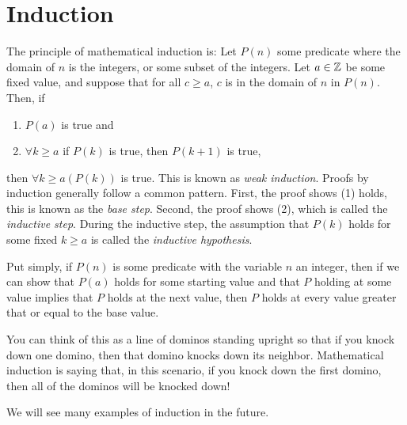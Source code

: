 \guard
\section{Induction}
\label{sec:induction}



The principle of mathematical induction is:
Let $P(n)$ some predicate where the domain of $n$ is the integers, or some subset of the integers.
Let $a\in\mathbb{Z}$ be some fixed value, and suppose that for all $c\geq a$, $c$ is in the domain of $n$ in $P(n)$.
Then, if
\begin{enumerate}
  \item $P(a)$ is true and
  \item $\forall k\geq a$ if $P(k)$ is true, then $P(k+1)$ is true,
\end{enumerate}
then $\forall k\geq a(P(k))$ is true.
This is known as \emph{weak induction}.
Proofs by induction generally follow a common pattern.
First, the proof shows (1) holds, this is known as the \emph{base step}.
Second, the proof shows (2), which is called the \emph{inductive step}.
During the inductive step, the assumption that $P(k)$ holds for some fixed $k\geq a$ is called the \emph{inductive hypothesis}.

Put simply, if $P(n)$ is some predicate with the variable $n$ an integer, then if we can show that $P(a)$ holds for some starting value and that $P$ holding at some value implies that $P$ holds at the next value, then $P$ holds at every value greater that or equal to the base value.

You can think of this as a line of dominos standing upright so that if you knock down one domino, then that domino knocks down its neighbor.
Mathematical induction is saying that, in this scenario, if you knock down the first domino, then all of the dominos will be knocked down!

We will see many examples of induction in the future.












